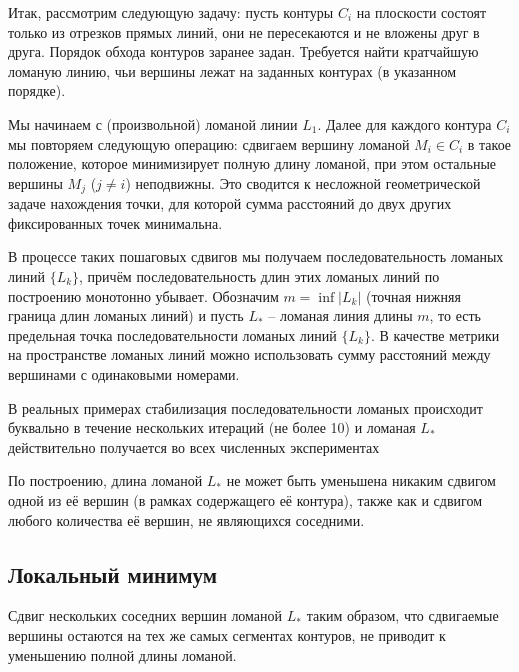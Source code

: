 Итак,
рассмотрим следующую задачу:
пусть контуры
$C_i$
на плоскости состоят
только из отрезков прямых линий,
они не пересекаются и не вложены друг в друга.
Порядок обхода контуров
заранее задан.
Требуется найти кратчайшую ломаную линию,
чьи вершины лежат на заданных контурах
(в указанном порядке).

Мы начинаем с
(произвольной)
ломаной линии
$L_1$.
Далее для каждого контура
$C_i$
мы повторяем следующую операцию:
сдвигаем вершину ломаной
$M_i \in C_i$
в такое положение,
которое минимизирует полную
длину ломаной,
при этом остальные вершины
$M_j$
($j \ne i$)
неподвижны.
Это сводится к несложной геометрической
задаче нахождения точки,
для которой сумма расстояний
до двух других фиксированных точек
минимальна.

В процессе таких пошаговых сдвигов
мы получаем последовательность
ломаных линий
$\{L_k\}$,
причём последовательность
длин этих ломаных линий
по построению монотонно убывает.
Обозначим
$m = \inf |L_k|$
(точная нижняя граница длин ломаных линий)
и пусть
$L_*$  --
ломаная линия длины
$m$,
то есть предельная точка
последовательности ломаных линий
$\{L_k\}$.
В качестве метрики на пространстве ломаных линий
можно использовать сумму расстояний между
вершинами с одинаковыми номерами.

В реальных примерах
стабилизация последовательности ломаных
происходит буквально в течение
нескольких итераций
(не более 10)
и ломаная
$L_*$
действительно получается
во всех численных экспериментах

По построению,
длина ломаной
$L_*$
не может быть уменьшена никаким сдвигом
одной из её вершин
(в рамках содержащего её контура),
также как и сдвигом
любого количества её вершин,
не являющихся соседними.

\subsection{Локальный минимум}

\begin{proposition}
  Сдвиг нескольких соседних вершин ломаной
  $L_*$
  таким образом,
  что сдвигаемые вершины остаются на тех же самых сегментах
  контуров,
  не приводит к уменьшению полной длины ломаной.
\end{proposition}

